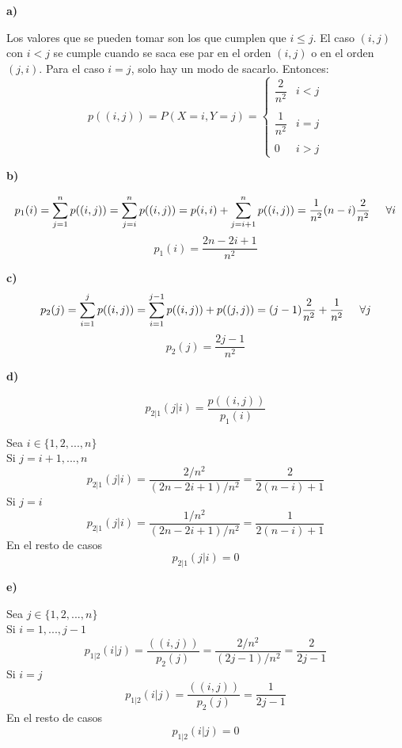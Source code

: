 \documentclass[openany]{book}
\begin{document}
\begin{exercise}
    $$  $$

    \textbf{a)}

    Los valores que se pueden tomar son los que cumplen que $ i\leq j $. El caso $ (i,j) $ con $ i<j $ se cumple cuando se saca ese par en el orden $ (i,j) $ o en el orden $ (j,i) $. Para el caso $ i=j $, solo hay un modo de sacarlo. Entonces:
    $$ p((i,j)) = P(X=i,Y=j) = \left\{
    \begin{array}{ll}
        \dfrac{2}{n^2} & i<j \\\\
        \dfrac{1}{n^2} & i = j \\ \\
        0 & i > j 
    \end{array}
    \right. $$

    \textbf{b)}
    

    $$ p_1(i) = \sum\limits_{j=1}^{n}  p((i,j)) = \sum\limits_{j=i}^{n} p((i,j)) = p(i,i) + \sum\limits_{j=i+1}^{n}p((i,j)) = \dfrac{1}{n^2}(n-i)\dfrac{2}{n^2}\hspace{5mm} \forall i$$
    $$ p_1(i) = \dfrac{2n-2i+1}{n^2} $$

    \textbf{c)}
    $$ p_2(j) = \sum\limits_{i=1}^{j}p((i,j)) = \sum\limits_{i=1}^{j-1}p((i,j)) + p((j,j)) = (j-1)\dfrac{2}{n^2}+\dfrac{1}{n^2}\hspace{5mm} \forall j$$
    $$  p_2(j) = \dfrac{2j-1}{n^2} $$

    \textbf{d)}

    $$ p_{2|1}(j|i) = \dfrac{p((i,j))}{p_1(i)}  $$

    Sea $  i \in \{1,2,...,n\} $\\
    Si $ j = i+1,...,n $
    $$ p_{2|1}(j|i) = \dfrac{2/n^2}{(2n-2i+1)/n^2} = \dfrac{2}{2(n-i)+1} $$
    Si $ j = i $
    $$ p_{2|1}(j|i) = \dfrac{1/n^2}{(2n-2i+1)/n^2} = \dfrac{1}{2(n-i)+1} $$
    En el resto de casos
    $$ p_{2|1}(j|i) = 0 $$

    \textbf{e)}

    Sea $ j \in \{1,2,...,n\} $\\
    Si $ i = 1,...,j-1 $
    $$ p_{1|2}(i|j) = \dfrac{((i,j))}{p_2(j)} = \dfrac{2/n^2}{(2j-1)/n^2} = \dfrac{2}{2j-1}$$
    Si $ i = j $
    $$ p_{1|2}(i|j) = \dfrac{((i,j))}{p_2(j)} = \dfrac{1}{2j-1}$$
    En el resto de casos
    $$ p_{1|2}(i|j) = 0 $$

\end{exercise}
\end{document}
